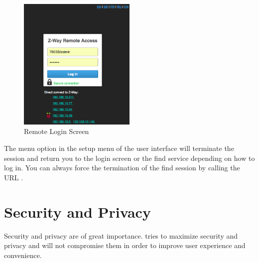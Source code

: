 \begin{figure}
\begin{center}
\includegraphics[width=0.5\textwidth]{pngs/cap3/sh1.png}
\caption{Remote Login Screen}
\label{sh1}
\end{center}
\end{figure}

The menu option  in the setup menu of the user interface will terminate 
the session and return you to the login screen or the find service depending on how to 
log in. You can always force the termination of the find session by calling the 
URL .

\section {Security and Privacy}

Security and privacy are of great importance. \zway tries to maximize security and privacy 
and will not compromise them in order to improve user experience and convenience.


